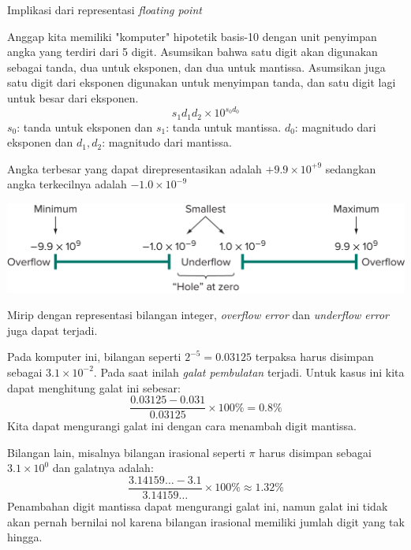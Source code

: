 \begin{frame}{Implikasi dari representasi \textit{floating point}}
\fontsize{9}{10}\selectfont

Anggap kita memiliki "komputer" hipotetik basis-10 dengan unit penyimpan angka
yang terdiri dari 5 digit. Asumsikan bahwa satu digit
akan digunakan sebagai tanda, dua untuk eksponen, dan dua untuk mantissa.
Asumsikan juga satu digit dari eksponen digunakan untuk menyimpan tanda, dan satu digit lagi
untuk besar dari eksponen.
$$
s_1 d_1 d_2 \times 10^{s_0 d_0}
$$
$s_0$: tanda untuk eksponen dan $s_1$: tanda untuk mantissa.
$d_0$: magnitudo dari eksponen dan $d_1, d_2$: magnitudo dari mantissa.

Angka terbesar yang dapat direpresentasikan adalah
$+9.9 \times 10^{+9}$ sedangkan angka terkecilnya adalah $-1.0 \times 10^{-9}$

{\centering
\includegraphics[height=0.25\textheight]{../chapra_python/Chapra_Fig_4_4.png}
\par}

Mirip dengan representasi bilangan integer, \emph{overflow error} dan
\emph{underflow error} juga dapat terjadi.


\end{frame}




\begin{frame}
\fontsize{9}{9}\selectfont

Pada komputer ini, bilangan seperti $2^{-5} = 0.03125$ terpaksa harus disimpan sebagai
$3.1\times 10^{-2}$. Pada saat inilah \emph{galat pembulatan} terjadi.
Untuk kasus ini kita dapat menghitung galat ini sebesar:
$$
\frac{0.03125 - 0.031}{0.03125}\times 100\% = 0.8\%
$$
Kita dapat mengurangi galat ini dengan cara menambah digit mantissa.

Bilangan lain, misalnya bilangan irasional seperti $\pi$ harus disimpan sebagai
$3.1\times 10^{0}$ dan galatnya adalah:
$$
\frac{3.14159\ldots - 3.1}{3.14159\ldots} \times 100\% \approx 1.32\%
$$
Penambahan digit mantissa dapat mengurangi galat ini, namun galat ini tidak akan pernah
bernilai nol karena bilangan irasional memiliki jumlah digit yang tak hingga.

\end{frame}


